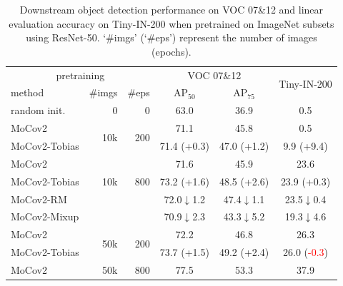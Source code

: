 \documentclass[letterpaper]{article}
\def\pt{\phantom{0}}
\begin{document}
\begin{table}
	\caption{Downstream object detection performance on VOC 07\&12 and linear evaluation accuracy on Tiny-IN-200 when pretrained on ImageNet subsets using ResNet-50. `\#imgs' (`\#eps') represent the number of images (epochs).}
	\label{tab:small-imagenet-result}
	\centering
	\small
	\setlength{\tabcolsep}{1.2pt}
	\renewcommand{\arraystretch}{0.95}
	\renewcommand{\multirowsetup}{\centering}
	\begin{tabular}{l|r|r|c|c|c}
		\hline
		\multicolumn{3}{c|}{pretraining}          &           \multicolumn{2}{c|}{VOC 07\&12}    &\multirow{2}{*}{Tiny-IN-200}         \\
		\cline{1-5}
		method & \#imgs&\#eps & $\text{AP}_{50}$ & $\text{AP}_{75}$ &\\
		\hline
		random init.                           &0&   0&     63.0 \pt\pt\pt\pt\pt         &       36.9 \pt\pt\pt\pt\pt        & \pt0.5 \pt\pt\pt\pt\pt \\
		\hline
		MoCov2	&\multirow{2}{*}{10k} &   \multirow{2}{*}{200}  &     71.1 \pt\pt\pt\pt\pt    &  45.8 \pt\pt\pt\pt\pt     &  \pt0.5 \pt\pt\pt\pt\pt   \\
		MoCov2-Tobias&&     &          71.4 (\textcolor{grassgreen}{+0.3})    &    47.0  (\textcolor{grassgreen}{+1.2})           & \pt9.9 (\textcolor{grassgreen}{+9.4})  \\
		\cline{1-6}
		MoCov2	&\multirow{3}{*}{10k} &   \multirow{3}{*}{800}  &     71.6 \pt\pt\pt\pt\pt     &  45.9 \pt\pt\pt\pt\pt     &  23.6 \pt\pt\pt\pt\pt   \\
		MoCov2-Tobias&&     &          73.2 (\textcolor{grassgreen}{+1.6})  &    48.5  (\textcolor{grassgreen}{+2.6})           & 23.9 (\textcolor{grassgreen}{+0.3})  \\
		MoCov2-RM&&     &          72.0\pt$\downarrow$1.2\pt     &    47.4\pt$\downarrow$1.1\pt           &  23.5\pt$\downarrow$0.4\pt   \\
		MoCov2-Mixup&&&70.9\pt$\downarrow$2.3\pt &43.3\pt$\downarrow$5.2\pt &19.3\pt$\downarrow$4.6\pt \\
		\cline{1-6}
		MoCov2&\multirow{2}{*}{50k} &   \multirow{2}{*}{200}  &          72.2 \pt\pt\pt\pt\pt  &      46.8 \pt\pt\pt\pt\pt              &    26.3 \pt\pt\pt\pt\pt \\
		MoCov2-Tobias& &    &     73.7 (\textcolor{grassgreen}{+1.5})  &  49.2 (\textcolor{grassgreen}{+2.4})     &  26.0 (\textcolor{red}{-0.3})\tiny\pt \\
		\cline{1-6}
		MoCov2&\multirow{3}{*}{50k} &   \multirow{3}{*}{800}  &          77.5 \pt\pt\pt\pt\pt  &    53.3  \pt\pt\pt\pt\pt              &    37.9 \pt\pt\pt\pt\pt \\

\end{tabular}
\end{table}
\end{document}
